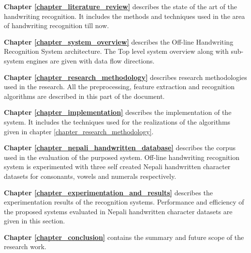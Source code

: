 \textbf{Chapter \ref{chapter_literature_review}} describes the state of the art of the handwriting recognition. It includes the methods and techniques used in the area of handwriting recognition till now.\par

\textbf{Chapter \ref{chapter_system_overview}} describes the Off-line Handwriting Recognition System architecture. The Top level system overview along with sub-system engines are given with data flow directions.\par

\textbf{Chapter \ref{chapter_research_methodology}} describes research methodologies used in the research. All the preprocessing, feature extraction and recognition algorithms are described in this part of the document.\par

\textbf{Chapter \ref{chapter_implementation}} describes the implementation of the system. It includes the techniques used for the realizations of the algorithms given in chapter \ref{chapter_research_methodology}.

\textbf{Chapter \ref{chapter_nepali_handwritten_database}} describes the corpus used in the evaluation of the purposed system. Off-line handwriting recognition system is experimented with three self created Nepali handwritten character datasets for consonants, vowels and numerals respectively.

\textbf{Chapter \ref{chapter_experimentation_and_results}} describes the experimentation results of the recognition systems. Performance and efficiency of the proposed systems evaluated in Nepali handwritten character datasets are given in this section.

\textbf{Chapter \ref{chapter_conclusion}} contains the summary and future scope of the research work.

